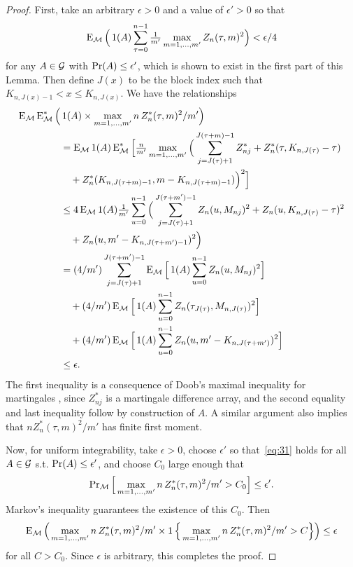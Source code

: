 \documentclass[11pt]{article}
\begin{document}
\begin{proof}
  First, take an arbitrary $\epsilon > 0$ and a value of $\epsilon' > 0$
  so that
  \begin{equation*}
    \operatorname{E}_{\mathcal{M}} \Big(\operatorname{1}(A) \sum_{\tau = 0}^{n-1} \tfrac{1}{m'} \max_{m = 1,\dots,m'}
    Z_n(\tau, m)^2\Big) < \epsilon / 4
  \end{equation*}
  for any $A \in \mathcal{G}$ with $\operatorname{Pr}(A) \leq \epsilon'$, which is shown to
  exist in the first part of this Lemma. Then define $J(x)$ to be the
  block index such that $K_{n,J(x) - 1} < x \leq K_{n,J(x)}$. We have
  the relationships
  \begin{align*}
    \operatorname{E}_{\mathcal{M}} \operatorname{E}_{\mathcal{M}}^* \Big(&\operatorname{1}(A) \times \max_{m = 1,\dots,m'} n \, Z^*_n(\tau, m)^2 / m'\Big) \\
    &= \operatorname{E}_{\mathcal{M}} \operatorname{1}(A) \operatorname{E}_{\mathcal{M}}^* \Big[ \tfrac{n}{m'}\max_{m = 1,\dots, m'}
    \Big(\sum_{j=J(\tau)+1}^{J(\tau + m)-1} Z_{nj}^*
    + Z_n^*(\tau, K_{n,J(\tau)} - \tau) \\
    &\quad+ Z_n^*(K_{n,J(\tau+m)-1}, m - K_{n,J(\tau + m)-1}) \Big)^2\Big] \\
    &\leq 4 \operatorname{E}_{\mathcal{M}} \operatorname{1}(A) \tfrac{1}{m'} \sum_{u = 0}^{n-1} \Big( \sum_{j=J(\tau)+1}^{J(\tau + m')-1}
    Z_n(u, M_{nj})^2 + Z_n(u, K_{n,J(\tau)} - \tau)^2 \\
    &\quad + Z_n(u, m' - K_{n,J(\tau+m')-1})^2\Big) \\
    &= (4/m') \sum_{j=J(\tau)+1}^{J(\tau + m')-1} \operatorname{E}_{\mathcal{M}}\Big[ \operatorname{1}(A) \sum_{u = 0}^{n-1} Z_n(u, M_{nj})^2\Big] \\
    &\quad + (4/m') \operatorname{E}_{\mathcal{M}}\Big[\operatorname{1}(A) \sum_{u = 0}^{n-1} Z_n(\tau_{J(\tau)}, M_{n,J(\tau)})^2\Big] \\
    &\quad + (4/m') \operatorname{E}_{\mathcal{M}}\Big[ \operatorname{1}(A)  \sum_{u = 0}^{n-1} Z_n(u, m' - K_{n,J(\tau+m')})^2\Big] \\
    &\leq \epsilon.
  \end{align*}
  The first inequality is a consequence of Doob's maximal inequality
  for martingales \citep[see][Theorem 15.15, for example]{Dav:94},
  since $Z_{nj}^*$ is a martingale difference array, and the second
  equality and last inequality follow by construction of $A$. A
  similar argument also implies that $n Z_n^*(\tau, m)^2 / m'$ has
  finite first moment.

  Now, for uniform integrability, take $\epsilon > 0$, choose
  $\epsilon'$ so that~\eqref{eq:31} holds for all $A \in \mathcal{G}$
  s.t. $\operatorname{Pr}(A) \leq \epsilon'$, and choose $C_0$ large enough that
  \begin{equation*}
    \operatorname{Pr}_{\mathcal{M}}\Big[ \max_{m = 1,\dots,m'} n \, Z^*_n(\tau, m)^2 / m' > C_0 \Big] \leq \epsilon'.
  \end{equation*}
  Markov's inequality guarantees the existence of this $C_0$. Then
  \begin{equation*}
    \operatorname{E}_{\mathcal{M}} \Big(\max_{m = 1,\dots,m'} n \, Z^*_n(\tau, m)^2 / m'
    \times \operatorname{1}\Big\{ \max_{m = 1,\dots,m'} n \, Z^*_n(\tau, m)^2 / m' > C \Big\}\Big) \leq \epsilon
  \end{equation*}
  for all $C > C_0$. Since $\epsilon$ is arbitrary, this completes the proof.
\end{proof}
\end{document}
